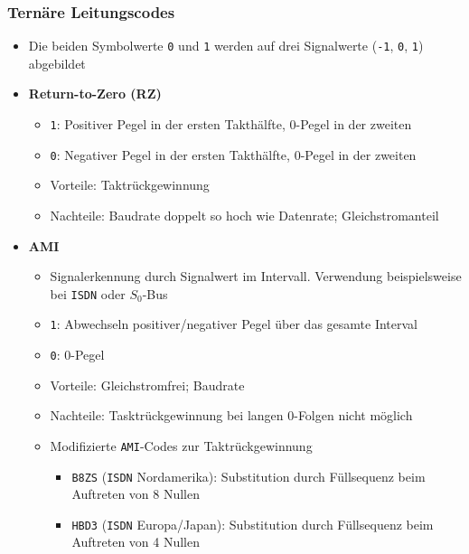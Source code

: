 \subsubsection{Ternäre Leitungscodes}
\begin{itemize}
	\item Die beiden Symbolwerte \texttt{0} und \texttt{1} werden auf drei Signalwerte (\texttt{-1}, \texttt{0}, \texttt{1}) abgebildet
	\item \textbf{Return-to-Zero (RZ)}
	\begin{itemize}
		\item \texttt{1}: Positiver Pegel in der ersten Takthälfte, 0-Pegel in der zweiten
		\item \texttt{0}: Negativer Pegel in der ersten Takthälfte, 0-Pegel in der zweiten
		\item Vorteile: Taktrückgewinnung
		\item Nachteile: Baudrate doppelt so hoch wie Datenrate; Gleichstromanteil
	\end{itemize}
	\item \textbf{AMI}
	\begin{itemize}
		\item Signalerkennung durch Signalwert im Intervall. Verwendung beispielsweise bei \texttt{ISDN} oder \(S_0\)-Bus
		\item \texttt{1}: Abwechseln positiver/negativer Pegel über das gesamte Interval
		\item \texttt{0}: 0-Pegel
		\item Vorteile: Gleichstromfrei; Baudrate
		\item Nachteile: Tasktrückgewinnung bei langen 0-Folgen nicht möglich
		\item Modifizierte \texttt{AMI}-Codes zur Taktrückgewinnung
		\begin{itemize}
			\item \texttt{B8ZS} (\texttt{ISDN} Nordamerika): Substitution durch Füllsequenz beim Auftreten von 8 Nullen
			\item \texttt{HBD3} (\texttt{ISDN} Europa/Japan): Substitution durch Füllsequenz beim Auftreten von 4 Nullen
		\end{itemize}
	\end{itemize}
\end{itemize}

